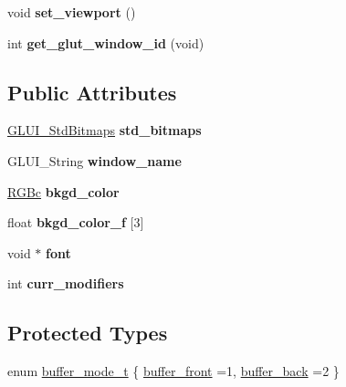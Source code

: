 \begin{DoxyCompactItemize}
\item 
\hypertarget{classGLUI__Main_a444621e91c377d33121f8bc95ed80d98}{void {\bfseries set\-\_\-viewport} ()}\label{classGLUI__Main_a444621e91c377d33121f8bc95ed80d98}

\item 
\hypertarget{classGLUI__Main_a8187156aa77f0f9b34660addf333ca79}{int {\bfseries get\-\_\-glut\-\_\-window\-\_\-id} (void)}\label{classGLUI__Main_a8187156aa77f0f9b34660addf333ca79}

\end{DoxyCompactItemize}
\subsection*{Public Attributes}
\begin{DoxyCompactItemize}
\item 
\hypertarget{classGLUI__Main_adae87a2e684c2da03d2f8946913eb63d}{\hyperlink{classGLUI__StdBitmaps}{G\-L\-U\-I\-\_\-\-Std\-Bitmaps} {\bfseries std\-\_\-bitmaps}}\label{classGLUI__Main_adae87a2e684c2da03d2f8946913eb63d}

\item 
\hypertarget{classGLUI__Main_a699c852cb777273543f38506e71c9e22}{G\-L\-U\-I\-\_\-\-String {\bfseries window\-\_\-name}}\label{classGLUI__Main_a699c852cb777273543f38506e71c9e22}

\item 
\hypertarget{classGLUI__Main_a8d939a35dd9fd89091e4345d12f23936}{\hyperlink{classRGBc}{R\-G\-Bc} {\bfseries bkgd\-\_\-color}}\label{classGLUI__Main_a8d939a35dd9fd89091e4345d12f23936}

\item 
\hypertarget{classGLUI__Main_a703f236c77d05226bf6ffd01c5c80d0d}{float {\bfseries bkgd\-\_\-color\-\_\-f} \mbox{[}3\mbox{]}}\label{classGLUI__Main_a703f236c77d05226bf6ffd01c5c80d0d}

\item 
\hypertarget{classGLUI__Main_a349e75284a3c1d4e5e8d1f2903d65f8b}{void $\ast$ {\bfseries font}}\label{classGLUI__Main_a349e75284a3c1d4e5e8d1f2903d65f8b}

\item 
\hypertarget{classGLUI__Main_a96ca3271c5e6a33bd340bd90aa010b14}{int {\bfseries curr\-\_\-modifiers}}\label{classGLUI__Main_a96ca3271c5e6a33bd340bd90aa010b14}

\end{DoxyCompactItemize}
\subsection*{Protected Types}
\begin{DoxyCompactItemize}
\item 
enum \hyperlink{classGLUI__Main_a0024f5e2750f6fe9e428ff885cf6d62e}{buffer\-\_\-mode\-\_\-t} \{ \hyperlink{classGLUI__Main_a0024f5e2750f6fe9e428ff885cf6d62ea96e503bd03e3d418f350f3a854d0292d}{buffer\-\_\-front} =1, 
\hyperlink{classGLUI__Main_a0024f5e2750f6fe9e428ff885cf6d62ea839b43cd2decf85c6bdcf738d92e122c}{buffer\-\_\-back} =2
 \}
\end{DoxyCompactItemize}
